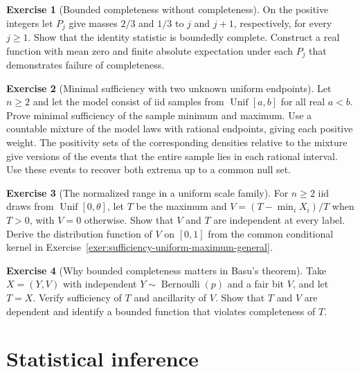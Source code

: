\documentclass[11pt,oneside]{book}
\theoremstyle{definition}
\newtheorem{exercise}{Exercise}[section]
\theoremstyle{remark}
\begin{document}
\begin{exercise}[Bounded completeness without completeness]
\label{exer:bounded-complete-not-complete}
On the positive integers let $P_j$ give masses $2/3$ and $1/3$ to
$j$ and $j+1$, respectively, for every $j\geq1$. Show that the
identity statistic is boundedly complete. Construct a real function
with mean zero and finite absolute expectation under each $P_j$
that demonstrates failure of completeness.
\end{exercise}

\begin{exercise}[Minimal sufficiency with two unknown uniform endpoints]
\label{exer:minimal-uniform-endpoints}
Let $n\geq2$ and let the model consist of iid samples from
$\operatorname{Unif}[a,b]$ for all real $a<b$. Prove minimal
sufficiency of the sample minimum and maximum. Use a countable
mixture of the model laws with rational endpoints, giving each
positive weight. The positivity sets of the corresponding
densities relative to the mixture give versions of the events
that the entire sample lies in each rational interval. Use these
events to recover both extrema up to a common null set.
\end{exercise}

\begin{exercise}[The normalized range in a uniform scale family]
\label{exer:basu-uniform-normalized-range}
For $n\geq2$ iid draws from $\operatorname{Unif}[0,\theta]$,
let $T$ be the maximum and $V=(T-\min_i X_i)/T$ when $T>0$,
with $V=0$ otherwise. Show that $V$ and $T$ are independent
at every label. Derive the distribution function of $V$ on
$[0,1]$ from the common conditional kernel in
Exercise~\ref{exer:sufficiency-uniform-maximum-general}.
\end{exercise}

\begin{exercise}[Why bounded completeness matters in Basu's theorem]
\label{exer:basu-incomplete-sufficiency}
Take $X=(Y,V)$ with independent $Y\sim\operatorname{Bernoulli}(p)$
and a fair bit $V$, and let $T=X$. Verify sufficiency of $T$
and ancillarity of $V$. Show that $T$ and $V$ are dependent and
identify a bounded function that violates completeness of $T$.
\end{exercise}



\part{Statistical inference}
\label{part:statistical-inference}
\end{document}
